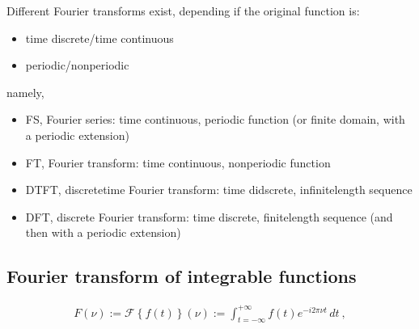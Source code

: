 \documentclass[letterpaper,10pt,english]{jupyterBook}
\begin{document}
\sphinxAtStartPar
Different Fourier transforms exist, depending if the original function is:
\begin{itemize}
\item {} 
\sphinxAtStartPar
time discrete/time continuous

\item {} 
\sphinxAtStartPar
periodic/non\sphinxhyphen{}periodic

\end{itemize}

\sphinxAtStartPar
namely,
\begin{itemize}
\item {} 
\sphinxAtStartPar
FS, Fourier series: time continuous, periodic function (or finite domain, with a periodic extension)

\item {} 
\sphinxAtStartPar
FT, Fourier transform: time continuous, non\sphinxhyphen{}periodic function

\item {} 
\sphinxAtStartPar
DTFT, discrete\sphinxhyphen{}time Fourier transform: time didscrete, infinite\sphinxhyphen{}length sequence

\item {} 
\sphinxAtStartPar
DFT, discrete Fourier transform: time discrete, finite\sphinxhyphen{}length sequence (and then with a periodic extension)

\end{itemize}


\subsection{Fourier transform of integrable functions}
\label{\detokenize{ch/complex/fourier-transforms:fourier-transform-of-integrable-functions}}\label{\detokenize{ch/complex/fourier-transforms:complex-fourier-transform}}\begin{equation*}
\begin{split}F(\nu) := \mathscr{F}\left\{f(t)\right\}(\nu) := \int_{t=-\infty}^{+\infty} f(t) e^{-i 2 \pi \nu t} \, dt \ ,\end{split}
\end{equation*}
\end{document}
